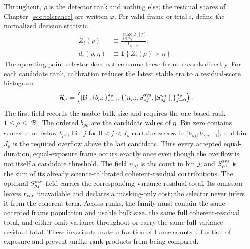 Throughout, $\rho$ is the detector rank and nothing else; the residual shares of Chapter~\ref{sec:tolerance} are written $\varphi$. For valid frame or trial $i$, define the normalized decision statistic
\begin{align}
Z_i(\rho) &\equiv
\frac{\max_{f\in\mathcal D_i}T_i[f]}{T_{i,(\rho)}},\\
d_i(\rho,\eta) &\equiv
\mathbf 1\!\left\{Z_i(\rho)>\eta\right\}.
\end{align}
The operating-point selector does not consume these frame records directly. For each candidate rank, calibration reduces the latest stable era to a residual-score histogram
\begin{equation}
\mathcal H_{\rho}
=\left(
|\mathcal B|,
\{b_{\rho k}\}_{k=1}^{J_\rho},
\{(n_{\rho j},S^{\rm sys}_{\rho j},[S^{\rm var}_{\rho j}])\}_{j=0}^{J_\rho}
\right).
\label{eq:detection:histogram}
\end{equation}
The first field records the usable bulk size and requires the one-based rank $1\le\rho\le|\mathcal B|$. The ordered $b_{\rho k}$ are the candidate values of $\eta$. Bin zero contains scores at or below $b_{\rho1}$, bin $j$ for $0<j<J_\rho$ contains scores in $(b_{\rho j},b_{\rho,j+1}]$, and bin $J_\rho$ is the required overflow above the last candidate. Thus every accepted equal-duration, equal-exposure frame occurs exactly once even though the overflow is not itself a candidate threshold. The field $n_{\rho j}$ is the count in bin $j$, and $S^{\rm sys}_{\rho j}$ is the sum of its already science-calibrated coherent-residual contributions. The optional $S^{\rm var}_{\rho j}$ field carries the corresponding variance-residual total. Its omission leaves $r_{\rm var}$ unavailable and declares a masking-only cost; the selector never infers it from the coherent term. Across ranks, the family must contain the same accepted frame population and usable bulk size, the same full coherent-residual total, and either omit variance throughout or carry the same full variance-residual total. These invariants make a fraction of frame counts a fraction of exposure and prevent unlike rank products from being compared.

